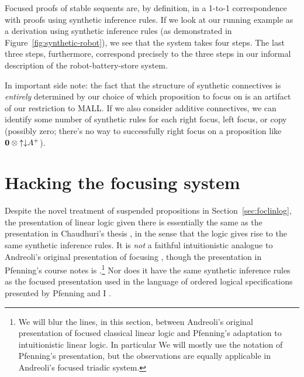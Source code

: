 Focused proofs of stable sequents are, by definition, in a 1-to-1
correspondence with proofs using synthetic inference rules. If we look
at our running example as a derivation using synthetic inference rules
(as demonstrated in Figure~\ref{fig:synthetic-robot}), we see that the
system takes four steps. The last three steps, furthermore, correspond
precisely to the three steps in our informal description of the
robot-battery-store system.

In important side note: the fact that the structure of synthetic
connectives is {\it
  entirely} determined by our choice of which proposition to focus 
on is an artifact of our restriction to MALL. If
we also consider additive connectives, we can identify some number of
synthetic rules for each right focus, left focus, or copy (possibly
zero; there's no way to successfully right focus on a proposition
like $\mathbf{0} \otimes {\uparrow}{\downarrow}A^+$).


\section{Hacking the focusing system}
\label{sec:linhack}

Despite the novel treatment of suspended propositions in
Section~\ref{sec:foclinlog}, the presentation of linear logic given
there is essentially the same as the presentation in Chaudhuri's
thesis \cite{chaudhuri06focused}, in the sense that the logic gives
rise to the same synthetic inference rules. It is {\it not} a faithful
intuitionistic analogue to Andreoli's original presentation of focusing
\cite{andreoli92logic}, though the presentation in Pfenning's course notes is
\cite{pfenning12chaining}.\footnote{We will blur the lines, in this
  section, between Andreoli's original presentation of focused
  classical linear logic and Pfenning's adaptation to intuitionistic
  linear logic. In particular We will mostly use the notation of
  Pfenning's presentation, but the observations are equally applicable
  in Andreoli's focused triadic system.}  Nor does it have the same
synthetic inference rules as the focused presentation used in the
language of ordered logical specifications presented by Pfenning and I
\cite{pfenning09substructural}.

